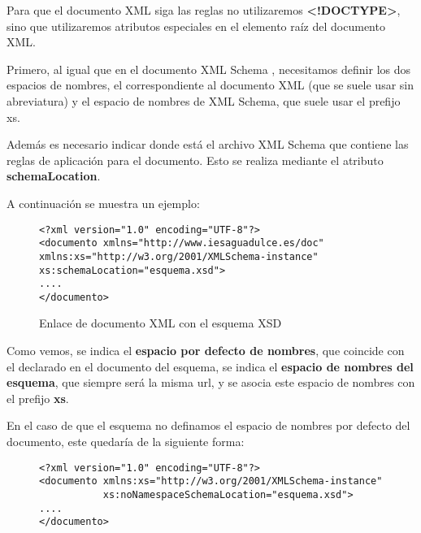 Para que el documento XML siga las reglas no utilizaremos \textbf{<!DOCTYPE>}, sino que utilizaremos atributos especiales en el elemento raíz del documento XML.

Primero, al igual que en el documento XML Schema , necesitamos definir los dos espacios de nombres, el correspondiente al documento XML (que se suele usar sin abreviatura) y el espacio de nombres de XML Schema, que suele usar el prefijo xs.

Además es necesario indicar donde está el archivo XML Schema que contiene las reglas de aplicación para el documento. Esto se realiza mediante el atributo \textbf{schemaLocation}.

A continuación se muestra un ejemplo:

\begin{figure}[h]
    \begin{tcolorbox}[sharp corners, colback=yellow!30, colframe=white!20]
        \scriptsize
        \begin{verbatim}
<?xml version="1.0" encoding="UTF-8"?>
<documento xmlns="http://www.iesaguadulce.es/doc" xmlns:xs="http://w3.org/2001/XMLSchema-instance"
xs:schemaLocation="esquema.xsd">
....
</documento>
        \end{verbatim}
    \end{tcolorbox}
    \caption{Enlace de documento XML con el esquema XSD}
\end{figure}

Como vemos, se indica el \textbf{espacio por defecto de nombres}, que coincide con el declarado en el documento del esquema, se indica el \textbf{espacio de nombres del esquema}, que siempre será la misma url, y se asocia este espacio de nombres con el prefijo \textbf{xs}.

En el caso de que el esquema no definamos el espacio de nombres por defecto del documento, este quedaría de la siguiente forma:

\begin{figure}[h]
    \begin{tcolorbox}[sharp corners, colback=yellow!30, colframe=white!20]
        \scriptsize
        \begin{verbatim}
<?xml version="1.0" encoding="UTF-8"?>
<documento xmlns:xs="http://w3.org/2001/XMLSchema-instance"
           xs:noNamespaceSchemaLocation="esquema.xsd">
....
</documento>
        \end{verbatim}
    \end{tcolorbox}
\end{figure}


